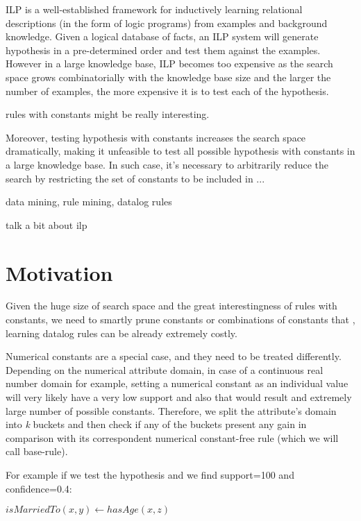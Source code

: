 
ILP is a well-established framework for inductively learning relational descriptions (in the form of logic programs)
from examples and background knowledge. Given a logical database of facts, an ILP system will generate hypothesis in a
pre-determined order and test them against the examples. However in a large knowledge base, ILP becomes too expensive as
the search space grows combinatorially with the knowledge base size and the larger the number of examples, the more
expensive it is to test each of the hypothesis.

rules with constants might be really interesting.


Moreover, testing hypothesis with constants increases the search space dramatically, making it unfeasible to test all
possible hypothesis with constants in a large knowledge base. In such case, it's necessary to arbitrarily reduce the
search by restricting the set of constants to be included in ...

data mining, rule mining, datalog rules



talk a bit about ilp

\section{Motivation}
Given the huge size of search space and the great interestingness of rules with constants, we need to smartly prune
constants or combinations of constants that , learning datalog rules can be already extremely costly.

Numerical constants are a special case, and they need to be treated differently. Depending on the numerical attribute
domain, in case of a continuous real number domain for example, setting a numerical constant as an individual value will
very likely have a very low support and also that would result and extremely large number of possible constants.
Therefore, we split the attribute's domain into \emph{k} buckets and then check if any of the buckets present any gain
in comparison with its correspondent numerical constant-free rule (which we will call base-rule).

For example if we test the hypothesis and we find support=100 and confidence=0.4:

\begin{center}
 \begin{math}isMarriedTo(x,y) \leftarrow hasAge(x,z)\end{math} 
\end{center}

